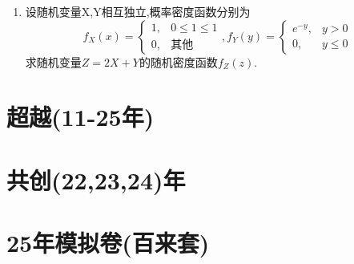 \documentclass[12pt, a4paper, oneside, UTF8]{ctexbook}
\begin{document}
\begin{enumerate}
    \item 设随机变量X,Y相互独立,概率密度函数分别为
    $$
    f_{X}(x)=\begin{cases}
        1, &0\leq 1\leq 1 \\
        0, &\text{其他}
    \end{cases},f_{Y}(y)=\begin{cases}
        e^{-y}, &y>0 \\
        0, &y\leq 0
    \end{cases}
    $$
    求随机变量$Z=2X+Y$的随机密度函数$f_{Z}(z)$.
\end{enumerate}

\newpage
\section{超越(11-25年)}

\newpage
\section{共创(22,23,24)年}

\newpage
\section{25年模拟卷(百来套)}

\ifx\allfiles\undefined
\end{document}

